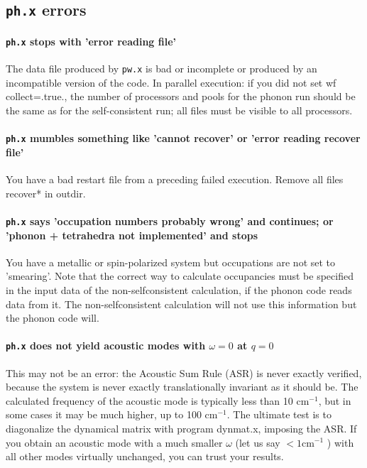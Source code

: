 \documentclass[12pt,a4paper]{article}
\def\pw.x{\texttt{pw.x}}
\def\ph.x{\texttt{ph.x}}
\begin{document}
\subsection{\ph.x errors}

\paragraph{\ph.x stops with 'error reading file'}
The data file produced by \pw.x
is bad or incomplete or produced by an incompatible version of the code.
In parallel execution: if you did not set wf collect=.true., the number
of processors and pools for the phonon run should be the same as for the
self-consistent run; all files must be visible to all processors.

\paragraph{\ph.x mumbles something like 'cannot recover' or 'error
  reading recover file'} 
You have a bad restart file from a preceding failed execution.
Remove all files recover* in outdir.

\paragraph{\ph.x says 'occupation numbers probably wrong' and
  continues; or 'phonon + tetrahedra not implemented' and stops} 
You have a
metallic or spin-polarized system but occupations are not set to 'smearing'.
Note that the correct way to calculate occupancies must be specified in the
input data of the non-selfconsistent calculation, if the phonon code reads
data from it. The non-selfconsistent calculation will not use this information
but the phonon code will.

\paragraph{\ph.x does not yield acoustic modes with $\omega=0$ at $q=0$}
This may not be an error: the Acoustic Sum Rule (ASR) is never exactly
verified, because the system is never exactly translationally
invariant as it should be.  The calculated frequency of the acoustic
mode is typically less than 10 cm$^{-1}$, but in some cases it may be
much higher, up to 100 cm$^{-1}$. The ultimate test is to diagonalize
the dynamical matrix with program dynmat.x, imposing the ASR. If you
obtain an acoustic mode with a much smaller $\omega$ (let us say 
$< 1 \mbox{cm}^{-1}$ ) 
with all other modes virtually unchanged, you can trust your results.
\end{document}
